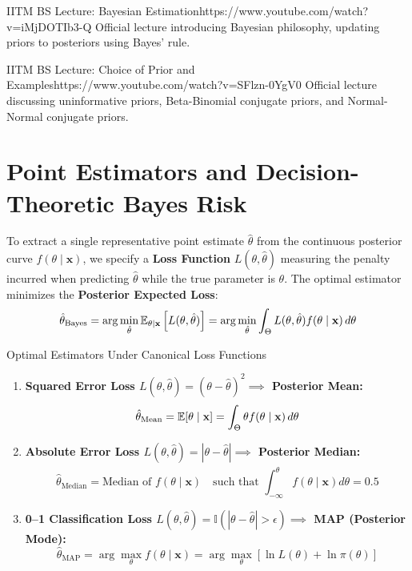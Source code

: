 \begin{videocard}{IITM BS Lecture: Bayesian Estimation}{https://www.youtube.com/watch?v=iMjDOTIb3-Q}
Official lecture introducing Bayesian philosophy, updating priors to posteriors using Bayes' rule.
\end{videocard}

\begin{videocard}{IITM BS Lecture: Choice of Prior and Examples}{https://www.youtube.com/watch?v=SFlzn-0YgV0}
Official lecture discussing uninformative priors, Beta-Binomial conjugate priors, and Normal-Normal conjugate priors.
\end{videocard}

\section{Point Estimators and Decision-Theoretic Bayes Risk}

To extract a single representative point estimate $\hat{\theta}$ from the continuous posterior curve $f(\theta \mid \mathbf{x})$, we specify a \textbf{Loss Function} $L(\theta, \hat{\theta})$ measuring the penalty incurred when predicting $\hat{\theta}$ while the true parameter is $\theta$. The optimal estimator minimizes the \textbf{Posterior Expected Loss}:
$$\hat{\theta}_{\text{Bayes}} = \arg\min_{\hat{\theta}} \mathbb{E}_{\theta|\mathbf{x}}\left[ L(\theta, \hat{\theta}) \right] = \arg\min_{\hat{\theta}} \int_{\Theta} L(\theta, \hat{\theta}) f(\theta \mid \mathbf{x}) \, d\theta$$

\begin{formulabox}{Optimal Estimators Under Canonical Loss Functions}
\begin{enumerate}
    \item \textbf{Squared Error Loss $L(\theta, \hat{\theta}) = (\theta - \hat{\theta})^2 \implies$ Posterior Mean:}
    $$\hat{\theta}_{\text{Mean}} = \mathbb{E}[\theta \mid \mathbf{x}] = \int_{\Theta} \theta f(\theta \mid \mathbf{x}) \, d\theta$$
    \item \textbf{Absolute Error Loss $L(\theta, \hat{\theta}) = |\theta - \hat{\theta}| \implies$ Posterior Median:}
    $$\hat{\theta}_{\text{Median}} = \text{Median of } f(\theta \mid \mathbf{x}) \quad \text{such that } \int_{-\infty}^{\hat{\theta}} f(\theta \mid \mathbf{x}) d\theta = 0.5$$
    \item \textbf{0--1 Classification Loss $L(\theta, \hat{\theta}) = \mathbb{I}(|\theta - \hat{\theta}| > \epsilon) \implies$ MAP (Posterior Mode):}
    $$\hat{\theta}_{\text{MAP}} = \arg\max_{\theta} f(\theta \mid \mathbf{x}) = \arg\max_{\theta} \left[ \ln L(\theta) + \ln \pi(\theta) \right]$$
\end{enumerate}
\end{formulabox}

